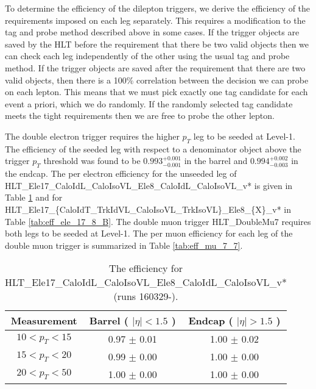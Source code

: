  
To determine the efficiency of the dilepton triggers, 
we derive the efficiency of the requirements imposed on each leg separately.
This requires a modification to the tag and probe method described above in some cases.
If the trigger objects are saved by the HLT before the requirement that there be two valid objects then
we can check each leg independently of the other using the usual tag and probe method.
If the trigger objects are saved after the requirement that there are two valid objects, then there is 
a 100\% correlation between the decision we can probe on each lepton.
This means that we must pick exactly one tag candidate for each event a priori, which we do 
randomly. 
If the randomly selected tag candidate meets the tight requirements then we are free to 
probe the other lepton.

The double electron trigger requires the higher $p_T$ leg to be seeded at Level-1.
The efficiency of the seeded leg with respect to a denominator object above the 
trigger $p_T$ threshold was found to be $0.993^{+0.001}_{-0.001}$ in the barrel and
$0.994^{+0.002}_{-0.003}$ in the endcap.
The per electron efficiency for the unseeded leg of 
HLT\_Ele17\_CaloIdL\_CaloIsoVL\_Ele8\_CaloIdL\_CaloIsoVL\_v*
is given in Table \ref{tab:eff_ele_17_8_A} and for\\
HLT\_Ele17\_\{CaloIdT\_TrkIdVL\_CaloIsoVL\_TrkIsoVL\}\_Ele8\_\{X\}\_v* in
Table \ref{tab:eff_ele_17_8_B}.
The double muon trigger {HLT\_DoubleMu7 } requires both legs to be seeded at Level-1.
The per muon efficiency for each leg of the double muon trigger is
summarized in Table \ref{tab:eff_mu_7_7}.

\begin{table}[!ht]
\begin{center}
\begin{tabular}{c|c|c}
\hline
Measurement & Barrel ( $|\eta|<1.5$ )   & Endcap ( $|\eta|>1.5$ )  \\ 
\hline
$  10<p_T<  15$ & 0.97 $\pm$ 0.01  & 1.00 $\pm$ 0.02  \\ \hline 
$  15<p_T<  20$ & 0.99 $\pm$ 0.00  & 1.00 $\pm$ 0.00  \\ \hline 
$  20<p_T<  50$ & 1.00 $\pm$ 0.00  & 1.00 $\pm$ 0.00  \\ \hline 
\end{tabular}
\caption{The efficiency for HLT\_Ele17\_CaloIdL\_CaloIsoVL\_Ele8\_CaloIdL\_CaloIsoVL\_v* (runs 160329-).}
\label{tab:eff_ele_17_8_A}
\end{center}
\end{table}

